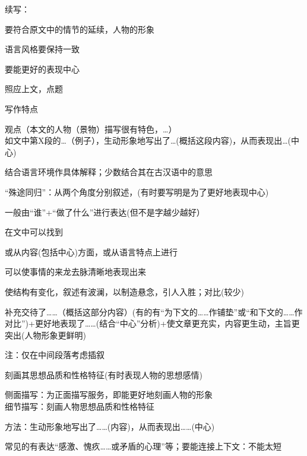续写：
\begin{asparaenum}[(1)]
\item 要符合原文中的情节的延续，人物的形象
\item 语言风格要保持一致
\item 要能更好的表现中心
\item 照应上文，点题
\end{asparaenum}
写作特点
\begin{asparaenum}
\item 观点（本文的人物（景物）描写很有特色，\ldots{}）\\如文中第X段的\ldots{}（例子），生动形象地写出了\ldots{}(概括这段内容)，从而表现出\ldots{}(中心)
\end{asparaenum}

结合语言环境作具体解释；少数结合其在古汉语中的意思

``殊途同归''：从两个角度分别叙述，(有时要写明是为了更好地表现中心)

一般由``谁''+``做了什么''进行表达(但不是字越少越好）

在文中可以找到

或从内容(包括中心)方面，或从语言特点上进行

可以使事情的来龙去脉清晰地表现出来

使结构有变化，叙述有波澜，以制造悬念，引人入胜；对比(较少)

补充交待了\ldots{}\ldots{}（概括这部分内容）(有的有``为下文的\ldots{}\ldots{}作铺垫''或``和下文的\ldots{}\ldots{}作对比'')+更好地表现了\ldots{}\ldots{}(结合``中心''分析)+使文章更充实，内容更生动，主旨更突出(人物形象更鲜明)\par
注：仅在中间段落考虑插叙

刻画其思想品质和性格特征(有时表现人物的思想感情)\par
侧面描写：为正面描写服务，即能更好地刻画人物的形象\\
细节描写：刻画人物思想品质和性格特征\par
方法：生动形象地写出了\ldots{}\ldots{}(内容)，从而表现出\ldots{}\ldots{}(中心)

常见的有表达``感激、愧疚\ldots{}\ldots{}或矛盾的心理''等；要能连接上下文：不能太短

